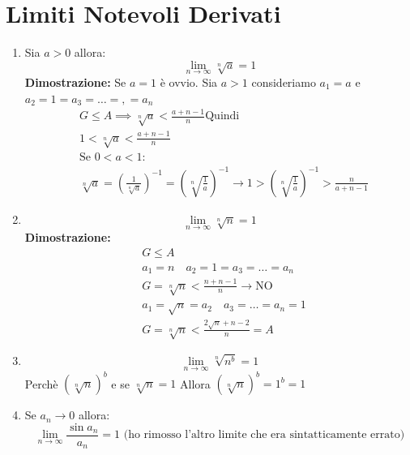 \section{Limiti Notevoli Derivati}\label{limiti-notevoli}

\begin{enumerate}
\def\labelenumi{\arabic{enumi})}
\item
  Sia \(a>0\) allora:
\[\lim_{ n \to \infty } \sqrt[n]{ a }=1 \]
\textbf{Dimostrazione:}
Se \(a=1\) è ovvio.
Sia \(a>1\) consideriamo \(a_1=a\) e \(a_{2}=1=a_{3}=\dots=,=a_{n}\)
\begin{align} %
& G \leq A \implies \sqrt[n]{a} < \frac{a+n-1}{n} \text{Quindi }\\
& 1 < \sqrt[n]{a} < \frac{a+n-1}{n} \\
& \text{Se } 0<a<1: \\
& \sqrt[n]{a} = \left( \frac{1}{\sqrt[n]{a}} \right)^{-1}=\left( \sqrt[n]{\frac{1}{a}} \right)^{-1}\to 1 > \left( \sqrt[n]{\frac{1}{a}}\right)^{-1} > \frac{n}{a+n-1}
\end{align}

\item
  \[\lim_{ n \to \infty } \sqrt[n]n=1\]
  \textbf{Dimostrazione:}
  \begin{align} %
   & G\leq A \\
   & a_{1} = n \quad a_{2}=1=a_{3}=\dots=a_{n}\\
   & G = \sqrt[n] n < \frac{{n+n-1}}{n} \to \text{NO} \\
   & a_{1}=\sqrt n=a_{2} \quad a_{3}=\dots=a_{n}=1 \\
   & G = \sqrt[n] n < \frac{2\sqrt n + n -2}{n} = A
  \end{align}
\item
  \[\lim_{ n \to \infty } \sqrt[n]{ n^b }=1\] Perchè
  \((\sqrt[n]{ n})^b\) e se \(\sqrt[n]{n}=1\) Allora
  \((\sqrt[n]{ n})^b=1^b=1\)
\item
  Se \(a_{n}\to 0\) allora:
  \[\lim_{ n \to \infty } \frac{\sin a_{n}}{a_{n}} = 1 \text{ (ho rimosso l'altro limite che era sintatticamente errato)} \]
  

\end{enumerate}
